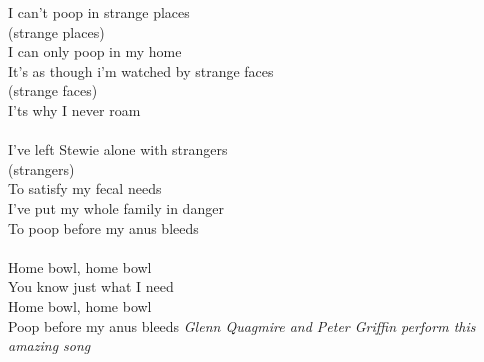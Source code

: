 \vspace{10pt}
\par
I can't poop in strange places\\
(strange places)\\
I can only poop in my home\\
It's as though i'm watched by strange faces\\
(strange faces)\\
I'ts why I never roam\\
\\
I've left Stewie alone with strangers\\
(strangers)\\
To satisfy my fecal needs\\
I've put my whole family in danger\\
To poop before my anus bleeds\\
\\
Home bowl, home bowl\\
You know just what I need\\
Home bowl, home bowl\\
Poop before my anus bleeds
\vspace{10pt}
{\footnotesize\textit{Glenn Quagmire and Peter Griffin perform this amazing song}}
